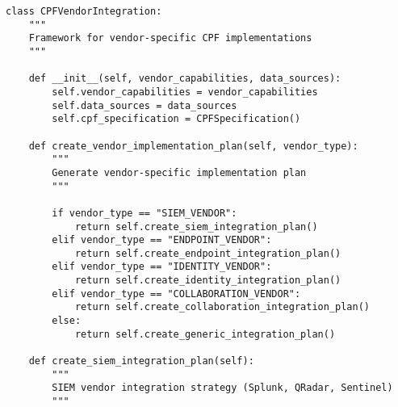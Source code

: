 \documentclass[10pt,twocolumn]{IEEEtran}
\begin{document}
\begin{lstlisting}[caption={Vendor Integration Framework}]
class CPFVendorIntegration:
    """
    Framework for vendor-specific CPF implementations
    """
    
    def __init__(self, vendor_capabilities, data_sources):
        self.vendor_capabilities = vendor_capabilities
        self.data_sources = data_sources
        self.cpf_specification = CPFSpecification()
        
    def create_vendor_implementation_plan(self, vendor_type):
        """
        Generate vendor-specific implementation plan
        """
        
        if vendor_type == "SIEM_VENDOR":
            return self.create_siem_integration_plan()
        elif vendor_type == "ENDPOINT_VENDOR":
            return self.create_endpoint_integration_plan()
        elif vendor_type == "IDENTITY_VENDOR":
            return self.create_identity_integration_plan()
        elif vendor_type == "COLLABORATION_VENDOR":
            return self.create_collaboration_integration_plan()
        else:
            return self.create_generic_integration_plan()
    
    def create_siem_integration_plan(self):
        """
        SIEM vendor integration strategy (Splunk, QRadar, Sentinel)
        """
        

\end{lstlisting}
\end{document}
